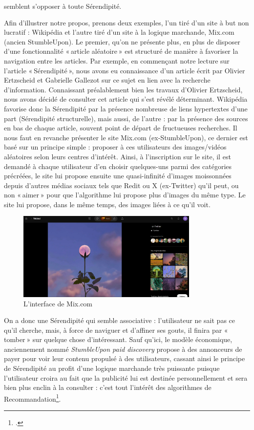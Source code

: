 semblent s’opposer à toute Sérendipité.

Afin d’illustrer notre propos, prenons deux exemples, l’un tiré d’un site à but non lucratif : Wikipédia et l’autre tiré d’un site à la logique marchande, Mix.com (ancien StumbleUpon). Le premier, qu’on ne présente plus, en plus de disposer d’une fonctionnalité « article aléatoire » est structuré de manière à favoriser la navigation entre les articles. Par exemple, en commençant notre lecture sur l’article « Sérendipité », nous avons eu connaissance d’un article écrit par Olivier Ertzscheid et Gabrielle Gallezot sur ce sujet en lien avec la recherche d’information. Connaissant préalablement bien les travaux d’Olivier Ertzscheid, nous avons décidé de consulter cet article qui s’est révélé déterminant. Wikipédia favorise donc la Sérendipité par la présence nombreuse de liens hypertextes d’une part (Sérendipité structurelle), mais aussi, de l’autre : par la présence des sources en bas de chaque article, souvent point de départ de fructueuses recherches. Il nous faut en revanche présenter le site Mix.com (ex-StumbleUpon), ce dernier est basé sur un principe simple : proposer à ces utilisateurs des images/vidéos aléatoires selon leurs centres d’intérêt. Ainsi, à l’inscription sur le site, il est demandé à chaque utilisateur d’en choisir quelques-uns parmi des catégories précréées, le site lui propose ensuite une quasi-infinité d’images moissonnées depuis d’autres médias sociaux tels que Redit ou X (ex-Twitter) qu’il peut, ou non « aimer » pour que l’algorithme lui propose plus d’images du même type. Le site lui propose, dans le même temps, des images liées à ce qu’il voit.


\begin{figure}[h!]
	\centering
	\includegraphics[width=0.8\textwidth]{images/image9.png}
	\caption{L'interface de Mix.com}
	\label{fig:image9}
\end{figure}


On a donc une Sérendipité qui semble associative : l’utilisateur ne sait pas ce qu’il cherche, mais, à force de naviguer et d’affiner ses gouts, il finira par « tomber » sur quelque chose d’intéressant. Sauf qu’ici, le modèle économique, anciennement nommé \textit{StumbleUpon paid discovery} propose à des annonceurs de payer pour voir leur contenu propulsé à des utilisateurs, cassant ainsi le principe de Sérendipité au profit d’une logique marchande très puissante puisque l’utilisateur croira au fait que la publicité lui est destinée personnellement et sera bien plus enclin à la consulter : c’est tout l’intérêt des algorithmes de Recommandation\footcite{author2012}.

